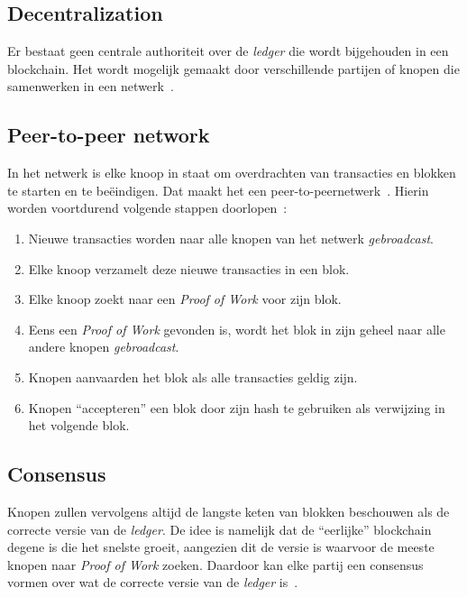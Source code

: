 \subsection{Decentralization}
\label{sub:decentralization}

Er bestaat geen centrale authoriteit over de \textit{ledger} die wordt bijgehouden in een blockchain. Het wordt mogelijk gemaakt door verschillende partijen of knopen die samenwerken in een netwerk~\autocite{Anita2019}.

\subsection{Peer-to-peer network}
\label{sub:peer-to-peer-network}

In het netwerk is elke knoop in staat om overdrachten van transacties en blokken te starten en te beëindigen. Dat maakt het een peer-to-peernetwerk~\autocite{Davidson2016}. Hierin worden voortdurend volgende stappen doorlopen~\autocite{Nakamoto2008}:

\begin{enumerate}
	\item Nieuwe transacties worden naar alle knopen van het netwerk \textit{gebroadcast}.
	\item Elke knoop verzamelt deze nieuwe transacties in een blok.
	\item Elke knoop zoekt naar een \textit{Proof of Work} voor zijn blok.
	\item Eens een \textit{Proof of Work} gevonden is, wordt het blok in zijn geheel naar alle andere knopen \textit{gebroadcast}.
	\item Knopen aanvaarden het blok als alle transacties geldig zijn.
	\item Knopen ``accepteren'' een blok door zijn hash te gebruiken als verwijzing in het volgende blok.
\end{enumerate}

\subsection{Consensus}
\label{sub:consensus}

Knopen zullen vervolgens altijd de langste keten van blokken beschouwen als de correcte versie van de \textit{ledger}. De idee is namelijk dat de ``eerlijke'' blockchain degene is die het snelste groeit, aangezien dit de versie is waarvoor de meeste knopen naar \textit{Proof of Work} zoeken. Daardoor kan elke partij een consensus vormen over wat de correcte versie van de \textit{ledger} is~\autocite{Anita2019}.

